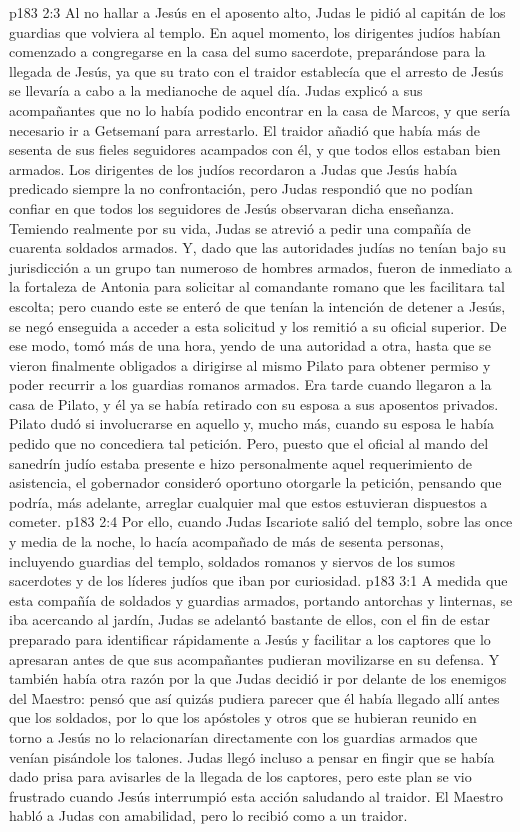 \vs p183 2:3 Al no hallar a Jesús en el aposento alto, Judas le pidió al capitán de los guardias que volviera al templo. En aquel momento, los dirigentes judíos habían comenzado a congregarse en la casa del sumo sacerdote, preparándose para la llegada de Jesús, ya que su trato con el traidor establecía que el arresto de Jesús se llevaría a cabo a la medianoche de aquel día. Judas explicó a sus acompañantes que no lo había podido encontrar en la casa de Marcos, y que sería necesario ir a Getsemaní para arrestarlo. El traidor añadió que había más de sesenta de sus fieles seguidores acampados con él, y que todos ellos estaban bien armados. Los dirigentes de los judíos recordaron a Judas que Jesús había predicado siempre la no confrontación, pero Judas respondió que no podían confiar en que todos los seguidores de Jesús observaran dicha enseñanza. Temiendo realmente por su vida, Judas se atrevió a pedir una compañía de cuarenta soldados armados. Y, dado que las autoridades judías no tenían bajo su jurisdicción a un grupo tan numeroso de hombres armados, fueron de inmediato a la fortaleza de Antonia para solicitar al comandante romano que les facilitara tal escolta; pero cuando este se enteró de que tenían la intención de detener a Jesús, se negó enseguida a acceder a esta solicitud y los remitió a su oficial superior. De ese modo, tomó más de una hora, yendo de una autoridad a otra, hasta que se vieron finalmente obligados a dirigirse al mismo Pilato para obtener permiso y poder recurrir a los guardias romanos armados. Era tarde cuando llegaron a la casa de Pilato, y él ya se había retirado con su esposa a sus aposentos privados. Pilato dudó si involucrarse en aquello y, mucho más, cuando su esposa le había pedido que no concediera tal petición. Pero, puesto que el oficial al mando del sanedrín judío estaba presente e hizo personalmente aquel requerimiento de asistencia, el gobernador consideró oportuno otorgarle la petición, pensando que podría, más adelante, arreglar cualquier mal que estos estuvieran dispuestos a cometer.
\vs p183 2:4 Por ello, cuando Judas Iscariote salió del templo, sobre las once y media de la noche, lo hacía acompañado de más de sesenta personas, incluyendo guardias del templo, soldados romanos y siervos de los sumos sacerdotes y de los líderes judíos que iban por curiosidad.
\vs p183 3:1 A medida que esta compañía de soldados y guardias armados, portando antorchas y linternas, se iba acercando al jardín, Judas se adelantó bastante de ellos, con el fin de estar preparado para identificar rápidamente a Jesús y facilitar a los captores que lo apresaran antes de que sus acompañantes pudieran movilizarse en su defensa. Y también había otra razón por la que Judas decidió ir por delante de los enemigos del Maestro: pensó que así quizás pudiera parecer que él había llegado allí antes que los soldados, por lo que los apóstoles y otros que se hubieran reunido en torno a Jesús no lo relacionarían directamente con los guardias armados que venían pisándole los talones. Judas llegó incluso a pensar en fingir que se había dado prisa para avisarles de la llegada de los captores, pero este plan se vio frustrado cuando Jesús interrumpió esta acción saludando al traidor. El Maestro habló a Judas con amabilidad, pero lo recibió como a un traidor.
